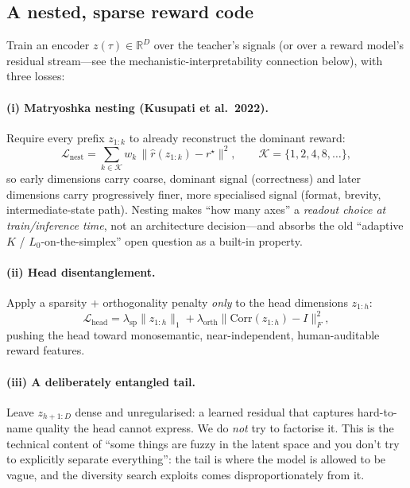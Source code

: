 \documentclass[11pt,a4paper]{article}
\newcommand{\R}{\mathbb{R}}
\begin{document}
\subsection{A nested, sparse reward code}

Train an encoder $z(\tau)\in\R^D$ over the teacher's signals (or over a
reward model's residual stream---see the mechanistic-interpretability
connection below), with three losses:

\paragraph{(i) Matryoshka nesting (Kusupati et al.\ 2022).}
Require every prefix $z_{1:k}$ to already reconstruct the dominant reward:
\begin{equation}
  \mathcal{L}_{\mathrm{nest}}
  = \sum_{k \in \mathcal{K}} w_k\,
    \big\| \hat r(z_{1:k}) - r^\star \big\|^2,
  \qquad \mathcal{K} = \{1,2,4,8,\dots\},
\end{equation}
so early dimensions carry coarse, dominant signal (correctness) and later
dimensions carry progressively finer, more specialised signal (format,
brevity, intermediate-state path).  Nesting makes ``how many axes'' a
\emph{readout choice at train/inference time}, not an architecture
decision---and absorbs the old ``adaptive $K$ / $L_0$-on-the-simplex'' open
question as a built-in property.

\paragraph{(ii) Head disentanglement.}
Apply a sparsity + orthogonality penalty \emph{only} to the head dimensions
$z_{1:h}$:
\begin{equation}
  \mathcal{L}_{\mathrm{head}}
  = \lambda_{\mathrm{sp}} \|z_{1:h}\|_1
  + \lambda_{\mathrm{orth}} \big\| \mathrm{Corr}(z_{1:h}) - I \big\|_F^2 ,
\end{equation}
pushing the head toward monosemantic, near-independent, human-auditable
reward features.

\paragraph{(iii) A deliberately entangled tail.}
Leave $z_{h+1:D}$ dense and unregularised: a learned residual that captures
hard-to-name quality the head cannot express.  We do \emph{not} try to
factorise it.  This is the technical content of ``some things are fuzzy in
the latent space and you don't try to explicitly separate everything'': the
tail is where the model is allowed to be vague, and the diversity search
exploits comes disproportionately from it.
\end{document}
